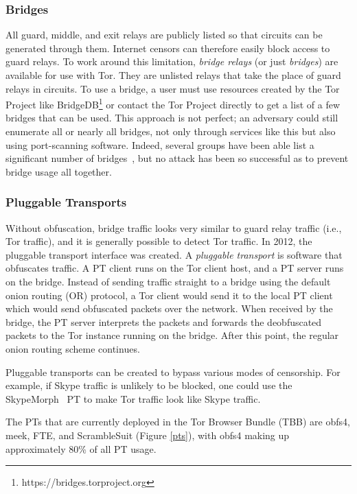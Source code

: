 \documentclass[11pt]{article}
\begin{document}
\subsubsection{Bridges}
All guard, middle, and exit relays are publicly listed so that circuits can be generated through them. Internet censors can therefore easily block access to guard relays. To work around this limitation, \textit{bridge relays} (or just \textit{bridges}) are available for use with Tor. They are unlisted relays that take the place of guard relays in circuits. To use a bridge, a user must use resources created by the Tor Project like BridgeDB\footnote{https://bridges.torproject.org} or contact the Tor Project directly to get a list of a few bridges that can be used. This approach is not perfect; an adversary could still enumerate all or nearly all bridges, not only through services like this but also using port-scanning software. Indeed, several groups have been able list a significant number of bridges~\cite{troncoso}, but no attack has been so successful as to prevent bridge usage all together.

\subsubsection{Pluggable Transports}
Without obfuscation, bridge traffic looks very similar to guard relay traffic (i.e., Tor traffic), and it is generally possible to detect Tor traffic.
In 2012, the pluggable transport interface was created. A \textit{pluggable transport} is software that obfuscates traffic. A PT client runs on the Tor client host, and a PT server runs on the bridge. Instead of sending traffic straight to a bridge using the default onion routing (OR) protocol, a Tor client would send it to the local PT client which would send obfuscated packets over the network. When received by the bridge, the PT server interprets the packets and forwards the deobfuscated packets to the Tor instance running on the bridge. After this point, the regular onion routing scheme continues.

Pluggable transports can be created to bypass various modes of censorship. For example, if Skype traffic is unlikely to be blocked, one could use the SkypeMorph~\cite{skypemorph} PT to make Tor traffic look like Skype traffic.

The PTs that are currently deployed in the Tor Browser Bundle (TBB) are obfs4, meek, FTE, and ScrambleSuit (Figure \ref{pts}), with obfs4 making up approximately 80\% of all PT usage.
\end{document}
